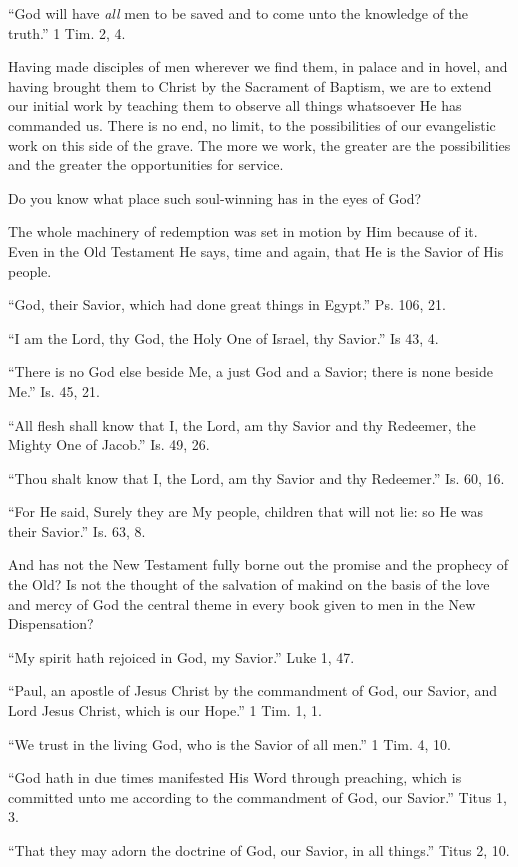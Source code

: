 \documentclass[
]{book}
\begin{document}
``God will have \emph{all} men to be saved and to come unto the knowledge of the truth.'' 1 Tim. 2, 4.

Having made disciples of men wherever we find them, in palace and in hovel, and having brought them to Christ by the Sacrament of Baptism, we are to extend our initial work by teaching them to observe all things whatsoever He has commanded us. There is no end, no limit, to the possibilities of our evangelistic work on this side of the grave. The more we work, the greater are the possibilities and the greater the opportunities for service.

Do you know what place such soul-winning has in the eyes of God?

The whole machinery of redemption was set in motion by Him because of it. Even in the Old Testament He says, time and again, that He is the Savior of His people.

``God, their Savior, which had done great things in Egypt.'' Ps. 106, 21.

``I am the Lord, thy God, the Holy One of Israel, thy Savior.'' Is 43, 4.

``There is no God else beside Me, a just God and a Savior; there is none beside Me.'' Is. 45, 21.

``All flesh shall know that I, the Lord, am thy Savior and thy Redeemer, the Mighty One of Jacob.'' Is. 49, 26.

``Thou shalt know that I, the Lord, am thy Savior and thy Redeemer.'' Is. 60, 16.

``For He said, Surely they are My people, children that will not lie: so He was their Savior.'' Is. 63, 8.

And has not the New Testament fully borne out the promise and the prophecy of the Old? Is not the thought of the salvation of makind on the basis of the love and mercy of God the central theme in every book given to men in the New Dispensation?

``My spirit hath rejoiced in God, my Savior.'' Luke 1, 47.

``Paul, an apostle of Jesus Christ by the commandment of God, our Savior, and Lord Jesus Christ, which is our Hope.'' 1 Tim. 1, 1.

``We trust in the living God, who is the Savior of all men.'' 1 Tim. 4, 10.

``God hath in due times manifested His Word through preaching, which is committed unto me according to the commandment of God, our Savior.'' Titus 1, 3.

``That they may adorn the doctrine of God, our Savior, in all things.'' Titus 2, 10.
\end{document}

